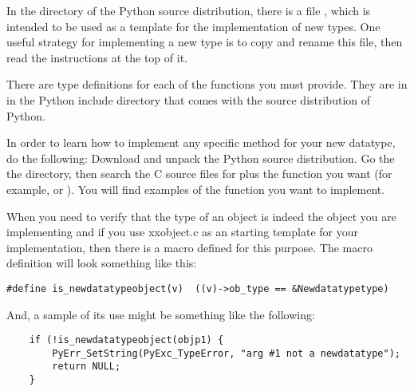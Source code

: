 In the  directory of the Python source distribution,
there is a file , which is intended to be used as a
template for the implementation of new types.  One useful strategy
for implementing a new type is to copy and rename this file, then
read the instructions at the top of it.

There are type definitions for each of the functions you must
provide.  They are in  in the Python include
directory that comes with the source distribution of Python.

In order to learn how to implement any specific method for your new
datatype, do the following: Download and unpack the Python source
distribution.  Go the the  directory, then search the
C source files for  plus the function you want (for
example,  or ).  You will find
examples of the function you want to implement.

When you need to verify that the type of an object is indeed the
object you are implementing and if you use xxobject.c as an starting
template for your implementation, then there is a macro defined for
this purpose. The macro definition will look something like this:

\begin{verbatim}
#define is_newdatatypeobject(v)  ((v)->ob_type == &Newdatatypetype)
\end{verbatim}

And, a sample of its use might be something like the following:

\begin{verbatim}
    if (!is_newdatatypeobject(objp1) {
        PyErr_SetString(PyExc_TypeError, "arg #1 not a newdatatype");
        return NULL;
    }
\end{verbatim}

